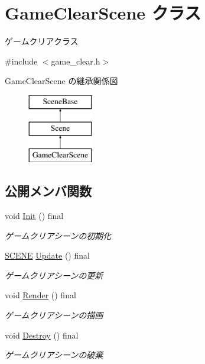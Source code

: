 \hypertarget{class_game_clear_scene}{}\section{Game\+Clear\+Scene クラス}
\label{class_game_clear_scene}


ゲームクリアクラス  




{\ttfamily \#include $<$game\+\_\+clear.\+h$>$}

Game\+Clear\+Scene の継承関係図\begin{figure}[H]
\begin{center}
\leavevmode
\includegraphics[height=3.000000cm]{class_game_clear_scene}
\end{center}
\end{figure}
\subsection*{公開メンバ関数}
\begin{DoxyCompactItemize}
\item 
void \mbox{\hyperlink{class_game_clear_scene_a59fcf2b5d5d7197d37ecb85c54e7712a}{Init}} () final
\begin{DoxyCompactList}\small\item\em ゲームクリアシーンの初期化 \end{DoxyCompactList}\item 
\mbox{\hyperlink{scene__base_8h_a24cee5343fb9d0706ead6e8601f363be}{S\+C\+E\+NE}} \mbox{\hyperlink{class_game_clear_scene_aebea5913506cc86d9570b286e69dfedd}{Update}} () final
\begin{DoxyCompactList}\small\item\em ゲームクリアシーンの更新 \end{DoxyCompactList}\item 
void \mbox{\hyperlink{class_game_clear_scene_addea514045f47860cfa23439b7bba075}{Render}} () final
\begin{DoxyCompactList}\small\item\em ゲームクリアシーンの描画 \end{DoxyCompactList}\item 
void \mbox{\hyperlink{class_game_clear_scene_a5a3a9e62bb0244b164d9e34663e99594}{Destroy}} () final
\begin{DoxyCompactList}\small\item\em ゲームクリアシーンの破棄 \end{DoxyCompactList}\end{DoxyCompactItemize}

